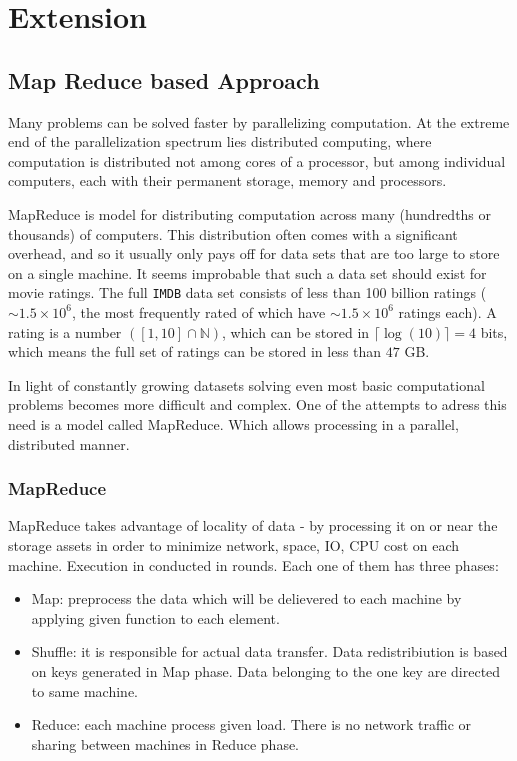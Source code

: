 \chapter{Extension}
\section{Map Reduce based Approach}
Many problems can be solved faster by parallelizing computation. At the extreme
end of the parallelization spectrum lies distributed computing, where
computation is distributed not among cores of a processor, but among individual
computers, each with their permanent storage, memory and processors.

MapReduce is model for distributing computation across many (hundredths or
thousands) of computers. This distribution often comes with a significant
overhead, and so it usually only pays off for data sets that are too large to
store on a single machine. It seems improbable that such a data set should exist
for movie ratings. The full \texttt{IMDB} data set consists of less than
100 billion ratings ($\sim 1.5 \times 10^6$, the most frequently rated of which
have $\sim 1.5 \times 10^6$ ratings each). A rating is a number
$\left(\left[1,10\right]\cap \mathbb{N}\right)$, which can be stored in
$\lceil \log(10)\rceil = 4$ bits, which means the full set of ratings can be
stored in less than $47$ GB.


In light of constantly growing datasets solving even 
most basic computational problems becomes more difficult and complex.
One of the attempts to adress this need is a model called MapReduce.
Which allows processing in a parallel, distributed manner.

\subsection{MapReduce}
MapReduce takes advantage of locality of data - by processing it on 
or near the storage assets in order to minimize network, space, IO, CPU cost on each machine.
Execution in conducted in rounds. Each one of them has three phases:

\begin{itemize}
\item Map: preprocess the data which will be delievered to each machine by applying 
given function to each element. 
\item Shuffle: it is responsible for actual data transfer. Data redistribiution is based on 
keys generated in Map phase. Data belonging to the one key are directed to same machine. 
\item Reduce: each machine process given load. There is no network traffic or sharing between machines
in Reduce phase.
\end{itemize}

